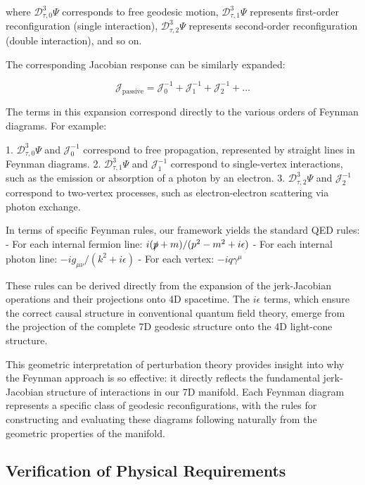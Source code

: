 \documentclass{article}
\begin{document}
where $\mathcal{D}_{\tau, 0}^3 \Psi$ corresponds to free geodesic motion, $\mathcal{D}_{\tau, 1}^3 \Psi$ represents first-order reconfiguration (single interaction), $\mathcal{D}_{\tau, 2}^3 \Psi$ represents second-order reconfiguration (double interaction), and so on.

The corresponding Jacobian response can be similarly expanded:

\begin{equation}
\mathcal{J}_{\text{passive}} = \mathcal{J}_0^{-1} + \mathcal{J}_1^{-1} + \mathcal{J}_2^{-1} + \ldots
\end{equation}

The terms in this expansion correspond directly to the various orders of Feynman diagrams. For example:

1. $\mathcal{D}_{\tau, 0}^3 \Psi$ and $\mathcal{J}_0^{-1}$ correspond to free propagation, represented by straight lines in Feynman diagrams.
2. $\mathcal{D}_{\tau, 1}^3 \Psi$ and $\mathcal{J}_1^{-1}$ correspond to single-vertex interactions, such as the emission or absorption of a photon by an electron.
3. $\mathcal{D}_{\tau, 2}^3 \Psi$ and $\mathcal{J}_2^{-1}$ correspond to two-vertex processes, such as electron-electron scattering via photon exchange.

In terms of specific Feynman rules, our framework yields the standard QED rules:
- For each internal fermion line: $i(\slashed{p}+m)/(p^2-m^2+i\epsilon)$
- For each internal photon line: $-ig_{\mu\nu}/(k^2+i\epsilon)$
- For each vertex: $-iq\gamma^\mu$

These rules can be derived directly from the expansion of the jerk-Jacobian operations and their projections onto 4D spacetime. The $i\epsilon$ terms, which ensure the correct causal structure in conventional quantum field theory, emerge from the projection of the complete 7D geodesic structure onto the 4D light-cone structure.

This geometric interpretation of perturbation theory provides insight into why the Feynman approach is so effective: it directly reflects the fundamental jerk-Jacobian structure of interactions in our 7D manifold. Each Feynman diagram represents a specific class of geodesic reconfigurations, with the rules for constructing and evaluating these diagrams following naturally from the geometric properties of the manifold.

\subsection{Verification of Physical Requirements}
\end{document}
